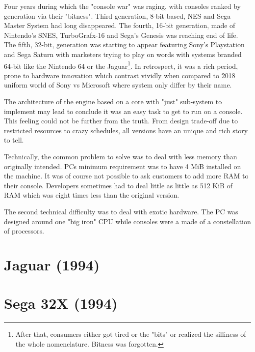 Four years during which the "console war" was raging, with consoles ranked by generation via their "bitness". Third generation, 8-bit based, NES and Sega Master System had long disappeared. The fourth, 16-bit generation, made of Nintendo's SNES, TurboGrafx-16 and Sega's Genesis was reaching end of life. The fifth, 32-bit, generation 
was starting to appear featuring Sony's Playstation and Sega Saturn with marketers trying to play on words with systems branded 64-bit like the Nintendo 64 or the Jaguar\footnote{After that, consumers either got tired or the "bits" or realized the silliness of the whole nomenclature. Bitness was forgotten.}. In retrospect, it was a rich period, prone to hardware innovation which contrast vividly when compared to 2018 uniform world of Sony vs Microsoft where system only differ by their name.\\
\par
The architecture of the engine based on a core with "just" sub-system to implement may lead to conclude it was an easy task to get \doom{} to run on a console. This feeling could not be further from the truth. From design trade-off due to restricted resources to crazy schedules, all versions have an unique and rich story to tell.\\
\par
Technically, the common problem to solve was to deal with less memory than originally intended. PCs minimum requirement was to have 4 MiB installed on the machine. It was of course not possible to ask customers to add more RAM to their console. Developers sometimes had to deal little as little as 512 KiB of RAM which was eight times less than the original version.\\
\par
The second technical difficulty was to deal with exotic hardware. The PC was designed around one "big iron" CPU while consoles were a made of a constellation of processors.












\section{Jaguar (1994)}
 




\section{Sega 32X (1994)}
 






